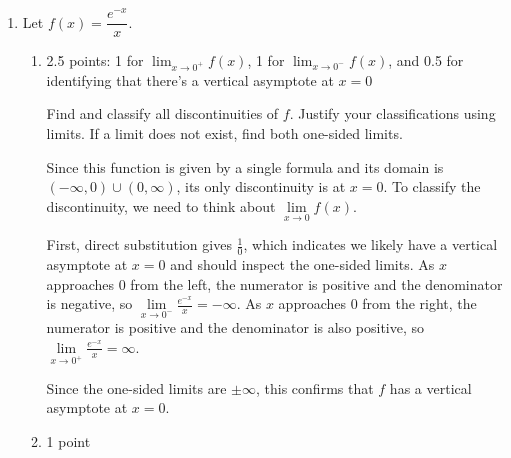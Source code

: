 \documentclass{article}
\newcommand{\highlight}[1]{\boldmath\hl{\textbf{#1}}\unboldmath}
\begin{document}
\begin{enumerate}
\begin{solution}
      \highlight{Answer the question:} The largest possible printed area is $128$
      square inches.
  \end{solution} 

\item \label{e^-x/x}

  Let $f(x) = \dfrac{e^{-x}}{x}$.

  \begin{enumerate}
  \item \label{e^-x/x-discontinuities}

    \begin{grading}
      2.5 points: 1 for $\displaystyle \lim_{x \to 0^+} f(x)$, 1 for $\displaystyle \lim_{x \to 0^-} f(x)$, and 0.5 for identifying that there's a vertical asymptote at $x = 0$
    \end{grading}

    \begin{problem}[\vfill]
      Find and classify all discontinuities of $f$. Justify your classifications using limits. If a limit does not exist, find both one-sided limits.
    \end{problem}

    \begin{solution}
      Since this function is given by a single formula and its domain is $(-\infty, 0) \cup
      (0, \infty)$, its only discontinuity is at $x=0$. To classify the discontinuity,
      we need to think about $\lim\limits_{x \to 0} f(x)$.

      First, direct substitution gives $\frac{1}{0}$, which indicates we likely have a
      vertical asymptote at $x=0$ and should inspect the one-sided limits. As $x$
      approaches $0$ from the left, the numerator is positive and the denominator is
      negative, so $\lim\limits_{x \to 0^-} \frac{e^{-x}}{x} = -\infty$. As $x$
      approaches $0$ from the right, the numerator is positive and the denominator
      is also positive, so $\lim\limits_{x \to 0^+} \frac{e^{-x}}{x} = \infty$.

      Since the one-sided limits are $\pm \infty$, this confirms that $f$ has a vertical
      asymptote at $x=0$.
    \end{solution}

  \item \label{e^-x/x-limit-to-infinity}

    \begin{grading}
      1 point
    \end{grading}


\end{enumerate}
\end{enumerate}
\end{document}
